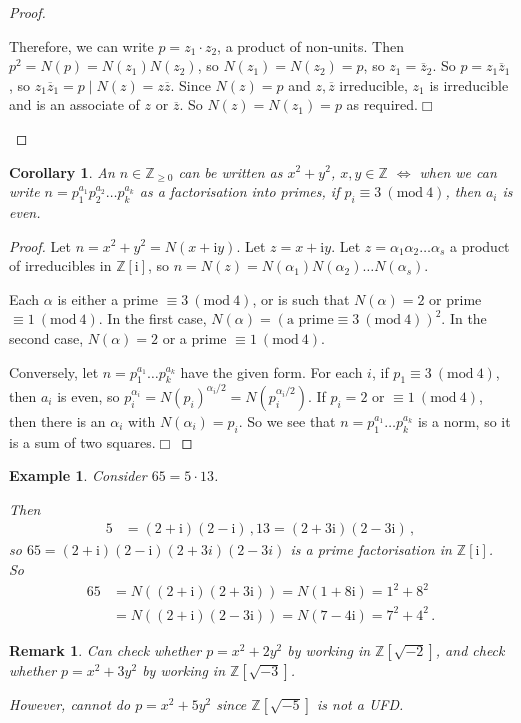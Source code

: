 \documentclass{article}
\theoremstyle{plain}\theoremheaderfont{\normalfont\itshape}\theorembodyfont{\rmfamily}\theoremseparator{.}\newtheorem*{rem}{Remark}\newtheorem*{ex}{Example}\newtheorem*{proof}{Proof}\newtheorem*{altp}{Alternative proof}\newtheorem*{nonex}{Non-Example}
\theoremstyle{plain}\theoremheaderfont{\normalfont\bfseries}\theorembodyfont{\rmfamily}\theoremseparator{.}\newtheorem{thm}{Theorem}[section]\newtheorem{lem}[thm]{Lemma}\newtheorem{prop}[thm]{Proposition}\newtheorem*{cor}{Corollary}\newtheorem{defn}[thm]{Definition}\newtheorem{clm}[thm]{Claim}\newtheorem{clminproof}{Claim}\newtheorem*{notn}{Notation}\newtheorem*{exer}{Exercise}\newtheorem*{lemnn}{Lemma}
\theoremstyle{break}\theoremheaderfont{\normalfont\itshape}\theorembodyfont{\rmfamily}\theoremseparator{.\medskip}\newtheorem*{proofskip}{Proof}\newtheorem*{exs}{Examples}\newtheorem*{rems}{Remarks}\newtheorem*{obs}{Observations}
\theoremstyle{break}\theoremheaderfont{\normalfont\bfseries}\theorembodyfont{\rmfamily}\theoremseparator{.\medskip}\newtheorem{lemskip}[thm]{Lemma}\newtheorem{defnskip}[thm]{Definition}\newtheorem{propskip}[thm]{Proposition}\newtheorem{thmskip}[thm]{Theorem}
\numberwithin{equation}{section}
\newcommand{\qed}{\hfill\ensuremath{\Box}}
\newcommand{\ii}{\mathrm{i}}
\newcommand{\ZZ}{\mathbb{Z}}
\newcommand{\MOD}[1]{\ (\mathrm{mod} \ #1)}
\begin{document}
\begin{proof}
\begin{enumerate}[topsep=0pt,label=(\roman*)]
            Therefore, we can write \(p=z_1\cdot z_2\), a product of non-units. Then \(p^2=N(p)=N(z_1)N(z_2)\), so \(N(z_1)=N(z_2)=p\), so \(z_1=\overline{z}_2\). So \(p=z_1\overline{z}_1\), so \(z_1\overline{z}_1=p\mid N(z)=z\overline{z}\). Since \(N(z)=p\) and \(z,\overline{z}\) irreducible, \(z_1\) is irreducible and is an associate of \(z\) or \(\overline{z}\). So \(N(z)=N(z_1)=p\) as required.\qed 
        \end{enumerate}
    \end{proof}
    \begin{cor}
        An \(n\in\ZZ_{\ge 0}\) can be written as \(x^2+y^2\), \(x,y\in\ZZ\) \(\iff\) when we can write \(n=p_1^{a_1}p_2^{a_2}\dots p_k^{a_k}\) as a factorisation into primes, if \(p_i\equiv 3\MOD{4}\), then \(a_i\) is even.
    \end{cor}
    \begin{proof}
        Let \(n=x^2+y^2=N(x+\ii y)\). Let \(z=x+\ii y\). Let \(z=\alpha_1\alpha_2\dots\alpha_s\) a product of irreducibles in \(\ZZ[\ii]\), so \(n=N(z)=N(\alpha_1)N(\alpha_2)\dots N(\alpha_s)\).

        Each \(\alpha\) is either a prime \(\equiv 3\MOD{4}\), or is such that \(N(\alpha)=2\) or prime \(\equiv 1\MOD{4}\). In the first case, \(N(\alpha)=(\text{a prime}\equiv 3\MOD{4})^2\). In the second case, \(N(\alpha)=2\) or a prime \(\equiv 1\MOD{4}\).

        Conversely, let \(n=p_1^{a_1}\dots p_k^{a_k}\) have the given form. For each \(i\), if \(p_1\equiv 3\MOD{4}\), then \(a_i\) is even, so \(p_i^{\alpha_i}=N(p_i)^{\alpha_i/2}=N(p_i^{\alpha_i/2})\). If \(p_i=2\) or \(\equiv 1\MOD{4}\), then there is an \(\alpha_i\) with \(N(\alpha_i)=p_i\). So we see that \(n=p_1^{a_1}\dots p_k^{a_k}\) is a norm, so it is a sum of two squares.\qed
    \end{proof}
    \begin{ex}
        Consider \(65=5\cdot 13\).

        Then
        \begin{align*}
            5&=(2+\ii)(2-\ii)\,,
            13=(2+3\ii)(2-3\ii)\,,
        \end{align*}
        so \(65=(2+\ii)(2-\ii)(2+3i)(2-3i)\) is a prime factorisation in \(\ZZ[\ii]\). So
        \begin{align*}
            65&=N((2+\ii)(2+3\ii))=N(1+8\ii)=1^2+8^2\\
            &=N((2+\ii)(2-3\ii))=N(7-4\ii)=7^2+4^2\,.
        \end{align*}
    \end{ex}
    \begin{rem}
        Can check whether \(p=x^2+2y^2\) by working in \(\ZZ[\sqrt{-2}]\), and check whether \(p=x^2+3y^2\) by working in \(\ZZ[\sqrt{-3}]\).

        However, cannot do \(p=x^2+5y^2\) since \(\ZZ[\sqrt{-5}]\) is not a UFD.
    \end{rem}
\end{document}
